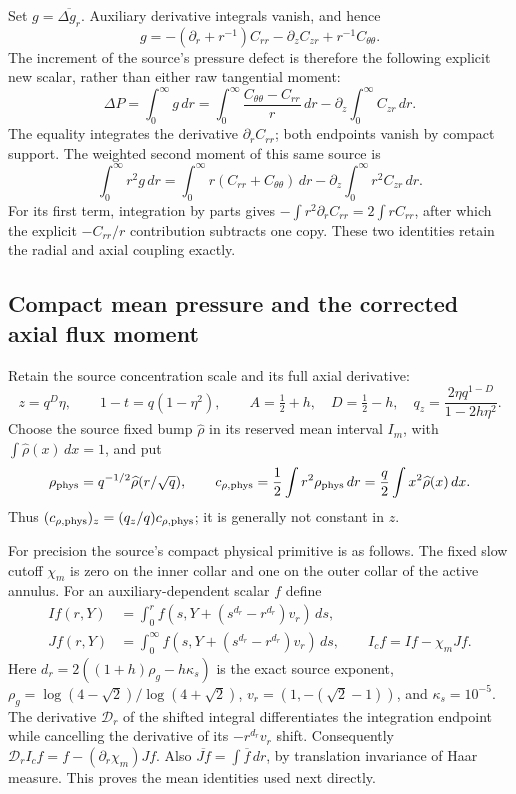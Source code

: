 \documentclass[11pt]{article}
\begin{document}
Set $g=\overline{\Delta g_r}$. Auxiliary derivative integrals vanish,
and hence
\begin{equation}\label{momop:gbar}
 g=-(\partial_r+r^{-1})C_{rr}-\partial_zC_{zr}
                                    +r^{-1}C_{\theta\theta}.
\end{equation}
The increment of the source's pressure defect is therefore the
following explicit new scalar, rather than either raw tangential moment:
\begin{equation}\label{momop:deltaP}
 \Delta P=\int_0^\infty g\,dr
 =\int_0^\infty\frac{C_{\theta\theta}-C_{rr}}r\,dr
                           -\partial_z\int_0^\infty C_{zr}\,dr .
\end{equation}
The equality integrates the derivative $\partial_rC_{rr}$;
both endpoints vanish by compact support. The weighted second
moment of this same source is
\begin{equation}\label{momop:gsecond}
 \int_0^\infty r^2g\,dr
 =\int_0^\infty r(C_{rr}+C_{\theta\theta})\,dr
                   -\partial_z\int_0^\infty r^2C_{zr}\,dr .
\end{equation}
For its first term, integration by parts gives
$-\int r^2\partial_rC_{rr}=2\int rC_{rr}$, after which the
explicit $-C_{rr}/r$ contribution subtracts one copy.
These two identities retain the radial and axial coupling exactly.

\subsection{Compact mean pressure and the corrected axial flux moment}

Retain the source concentration scale and its full axial derivative:
\[
 z=q^D\eta,\qquad 1-t=q(1-\eta^2),\qquad
 A=\tfrac12+h,\quad D=\tfrac12-h,\quad
 q_z=\frac{2\eta q^{1-D}}{1-2h\eta^2}.
\]
Choose the source fixed bump $\widehat\rho$ in its reserved mean
interval $I_m$, with $\int\widehat\rho(x)\,dx=1$, and put
\[
 \rho_{\rm phys}=q^{-1/2}\widehat\rho(r/\sqrt q),\qquad
 c_{\rho,\rm phys}=\frac12\int r^2\rho_{\rm phys}\,dr
             =\frac q2\int x^2\widehat\rho(x)\,dx .
\]
Thus $(c_{\rho,\rm phys})_z=(q_z/q)c_{\rho,\rm phys}$;
it is generally not constant in $z$.

For precision the source's compact physical primitive is as follows.
The fixed slow cutoff $\chi_m$ is zero on the inner collar and one
on the outer collar of the active annulus. For an auxiliary-dependent
scalar $f$ define
\[
 \begin{split}
 I f(r,Y)&=\int_0^r
 f(s,Y+(s^{d_r}-r^{d_r})v_r)\,ds,\\
 J f(r,Y)&=\int_0^\infty
 f(s,Y+(s^{d_r}-r^{d_r})v_r)\,ds,\qquad
 I_cf=If-\chi_mJf.
 \end{split}
\]
Here $d_r=2((1+h)\rho_g-h\kappa_s)$ is the exact source exponent,
$\rho_g=\log(4-\sqrt2)/\log(4+\sqrt2)$,
$v_r=(1,-(\sqrt2-1))$, and $\kappa_s=10^{-5}$.
The derivative $\mathcal D_r$ of the shifted integral differentiates
the integration endpoint while cancelling the derivative of its
$-r^{d_r}v_r$ shift. Consequently
$\mathcal D_rI_cf=f-(\partial_r\chi_m)Jf$.
Also $\overline{Jf}=\int\overline f\,dr$, by translation invariance
of Haar measure. This proves the mean identities used next directly.
\end{document}
